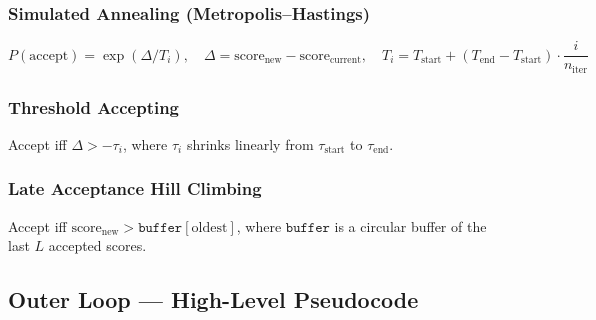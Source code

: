\documentclass[11pt,a4paper]{article}
\begin{document}
\subsubsection{Simulated Annealing (Metropolis--Hastings)}
\[
P(\text{accept}) = \exp(\Delta / T_i), \quad \Delta = \text{score}_{\text{new}} - \text{score}_{\text{current}}, \quad T_i = T_{\text{start}} + (T_{\text{end}} - T_{\text{start}}) \cdot \frac{i}{n_{\text{iter}}}
\]

\subsubsection{Threshold Accepting}
Accept iff $\Delta > -\tau_i$, where $\tau_i$ shrinks linearly from $\tau_{\text{start}}$ to $\tau_{\text{end}}$.

\subsubsection{Late Acceptance Hill Climbing}
Accept iff $\text{score}_{\text{new}} > \texttt{buffer}[\text{oldest}]$, where $\texttt{buffer}$ is a circular buffer of the last $L$ accepted scores.


\subsection{Outer Loop --- High-Level Pseudocode}
\end{document}
